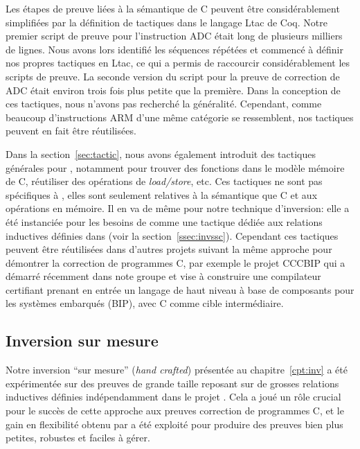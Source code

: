 Les étapes de preuve liées à la sémantique de \compcert C peuvent être
considérablement simplifiées par la définition de tactiques dans le langage Ltac de Coq.
Notre premier script de preuve pour l'instruction ADC était long de 
plusieurs milliers de lignes.
Nous avons lors identifié les séquences répétées et commencé à définir
nos propres tactiques en Ltac,
ce qui a permis de raccourcir considérablement les scripts de preuve. 
La seconde version du script pour la preuve de correction de ADC
était environ trois fois plus petite que la première.
Dans la conception de ces tactiques, nous n'avons pas recherché la généralité.
Cependant, comme beaucoup d'instructions ARM d'une même catégorie
se ressemblent, nos tactiques peuvent en fait être réutilisées.

Dans la section~\ref{sec:tactic}, nous avons également introduit des tactiques
générales pour \simsoccert,
notamment pour trouver des fonctions dans le modèle mémoire de C, 
réutiliser des opérations de \emph{load/store}, etc.
Ces tactiques ne sont pas spécifiques à \simlight,
elles sont seulement relatives à la sémantique que \compcert C et
aux opérations en mémoire. 
Il en va de même pour notre technique d'inversion:
elle a été instanciée pour les besoins de \simsoccert comme une tactique
\hcinv dédiée aux relations inductives définies dans \compcert
(voir la section~\ref{ssec:invssc}).
Cependant ces tactiques peuvent être réutilisées dans d'autres projets
suivant la même approche pour démontrer la correction de programmes \compcert C,
par exemple le projet CCCBIP qui a démarré récemment dans note groupe et vise
à construire une compilateur certifiant prenant en entrée un langage
de haut niveau à base de composants pour les systèmes embarqués (BIP),
avec \compcert C comme cible intermédiaire.



\subsection*{Inversion sur mesure}

Notre inversion ``sur mesure'' (\emph{hand crafted})
présentée au chapitre~\ref{cpt:inv} a été expérimentée sur des preuves
de grande taille reposant sur de grosses relations inductives définies
indépendamment dans le projet \compcert.
Cela a joué un rôle crucial pour le succès de cette approche 
aux preuves correction de programmes C,
et le gain en flexibilité obtenu par \hcinv a été exploité pour
produire des preuves bien plus petites, robustes et faciles à gérer.

